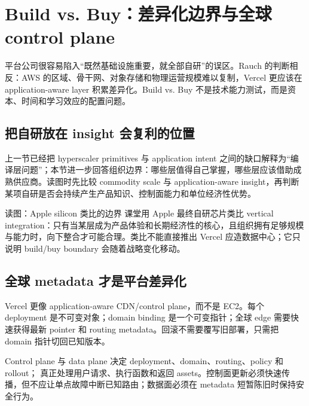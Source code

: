 \section{Build vs. Buy：差异化边界与全球 control plane}

平台公司很容易陷入“既然基础设施重要，就全部自研”的误区。Rauch 的判断相反：AWS 的区域、骨干网、对象存储和物理运营规模难以复制，Vercel 更应该在 application-aware layer 积累差异化。Build vs. Buy 不是技术能力测试，而是资本、时间和学习效应的配置问题。

\subsection{把自研放在 insight 会复利的位置}

上一节已经把 hyperscaler primitives 与 application intent 之间的缺口解释为“编译层问题”；本节进一步回答组织边界：哪些层值得自己掌握，哪些层应该借助成熟供应商。读图时先比较 commodity scale 与 application-aware insight，再判断某项自研是否会持续产生产品知识、控制面能力和单位经济性优势。


\begin{knowledgebox}{读图：Apple silicon 类比的边界}
课堂用 Apple 最终自研芯片类比 vertical integration：只有当某层成为产品体验和长期经济性的核心，且组织拥有足够规模与能力时，向下整合才可能合理。类比不能直接推出 Vercel 应造数据中心；它只说明 build/buy boundary 会随着战略变化移动。
\end{knowledgebox}

\subsection{全球 metadata 才是平台差异化}

Vercel 更像 application-aware CDN/control plane，而不是 EC2。每个 deployment 是不可变对象；domain binding 是一个可变指针；全球 edge 需要快速获得最新 pointer 和 routing metadata。回滚不需要覆写旧部署，只需把 domain 指针切回已知版本。


\begin{importantbox}{Control plane 与 data plane}
 决定 deployment、domain、routing、policy 和 rollout； 真正处理用户请求、执行函数和返回 assets。控制面更新必须快速传播，但不应让单点故障中断已知路由；数据面必须在 metadata 短暂陈旧时保持安全行为。
\end{importantbox}

